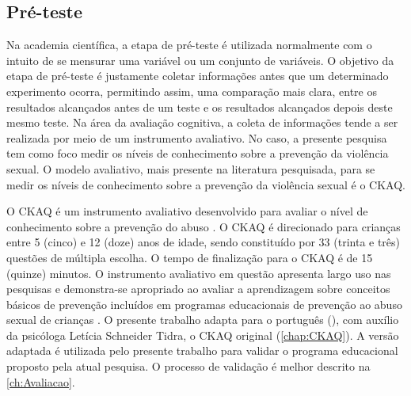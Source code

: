 \subsection{Pré-teste}\label{subsec:preteste}

Na academia científica, a etapa de pré-teste é utilizada normalmente com o intuito de se mensurar uma variável ou um conjunto de variáveis. O objetivo da etapa de pré-teste é justamente coletar informações antes que um determinado experimento ocorra, permitindo assim, uma comparação mais clara, entre os resultados alcançados antes de um teste e os resultados alcançados depois deste mesmo teste. Na área da avaliação cognitiva, a coleta de informações tende a ser realizada por meio de um instrumento avaliativo. No caso, a presente pesquisa tem como foco medir os níveis de conhecimento sobre a prevenção da violência sexual. O modelo avaliativo, mais presente na literatura pesquisada, para se medir os níveis de conhecimento sobre a prevenção da violência sexual é o \ac{CKAQ}.

O \ac{CKAQ} é um instrumento avaliativo desenvolvido para avaliar o nível de conhecimento sobre a prevenção do abuso \cite{tutty1992ability}. O \ac{CKAQ} é direcionado para crianças entre 5 (cinco) e 12 (doze) anos de idade, sendo constituído por 33 (trinta e três) questões de múltipla escolha. O tempo de finalização para o \ac{CKAQ} é de 15 (quinze) minutos. O instrumento avaliativo em questão apresenta largo uso nas pesquisas e demonstra-se apropriado ao avaliar a aprendizagem sobre conceitos básicos de prevenção incluídos em programas educacionais de prevenção ao abuso sexual de crianças \cite{tutty1992ability}. O presente trabalho adapta para o português (), com auxílio da psicóloga Letícia Schneider Tidra, o \ac{CKAQ} original (\autoref{chap:CKAQ}). A versão adaptada é utilizada pelo presente trabalho para validar o programa educacional proposto pela atual pesquisa. O processo de validação é melhor descrito na \autoref{ch:Avaliacao}.



